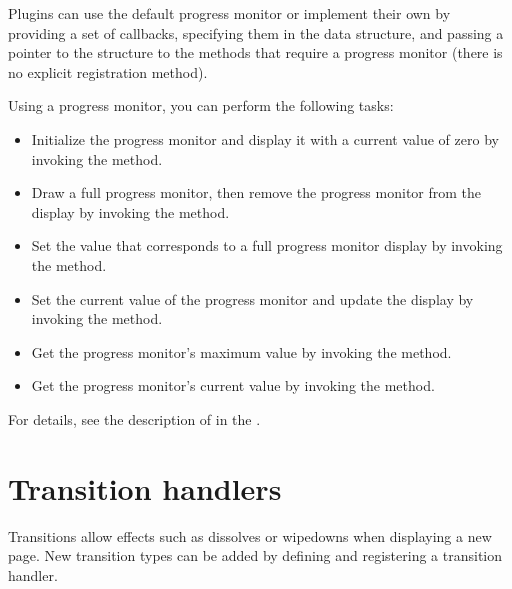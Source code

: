 \documentclass[letterpaper,12pt,english,openany,oneside]{sphinxmanual}
\begin{document}
Plugins can use the default progress monitor or implement their own by providing a set of callbacks, specifying them in the  data structure, and passing a pointer to the structure to the methods that require a progress monitor (there is no explicit registration method).

Using a progress monitor, you can perform the following tasks:
\begin{itemize}
\item {} 
Initialize the progress monitor and display it with a current value of zero by invoking the  method.

\item {} 
Draw a full progress monitor, then remove the progress monitor from the display by invoking the  method.

\item {} 
Set the value that corresponds to a full progress monitor display by invoking the  method.

\item {} 
Set the current value of the progress monitor and update the display by invoking the  method.

\item {} 
Get the progress monitor’s maximum value by invoking the  method.

\item {} 
Get the progress monitor’s current value by invoking the  method.

\end{itemize}

For details, see the description of  in the .


\section{Transition handlers}
\label{\detokenize{Plugins_Handlers:transition-handlers}}
Transitions allow effects such as dissolves or wipe\sphinxhyphen{}downs when displaying a new page. New transition types can be added by defining and registering a transition handler.
\end{document}
